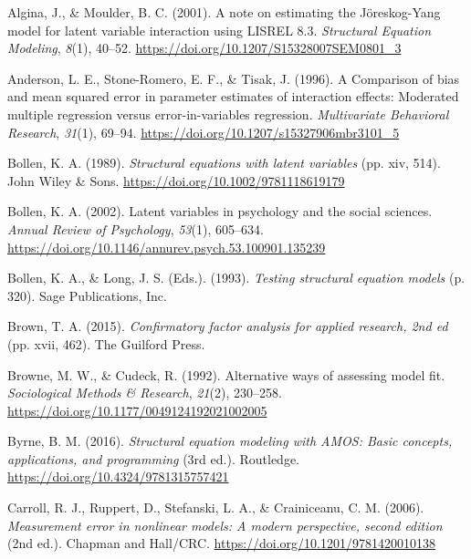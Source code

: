 \documentclass[
  man]{apa6}
\newlength{\cslhangindent}
\newenvironment{CSLReferences}[2] %
 {\begin{list}{}{%
  \setlength{\itemindent}{0pt}
  \setlength{\leftmargin}{0pt}
  \setlength{\parsep}{0pt}
  \ifodd #1
   \setlength{\leftmargin}{\cslhangindent}
   \setlength{\itemindent}{-1\cslhangindent}
  \fi
  \setlength{\itemsep}{#2\baselineskip}}}
 {\end{list}}
\begin{document}
\label{refs}
\begin{CSLReferences}{1}{0}
Algina, J., \& Moulder, B. C. (2001). A note on estimating the {J{ö}reskog-Yang} model for latent variable interaction using {LISREL} 8.3. \emph{Structural Equation Modeling}, \emph{8}(1), 40--52. \url{https://doi.org/10.1207/S15328007SEM0801_3}

Anderson, L. E., Stone-Romero, E. F., \& Tisak, J. (1996). A {Comparison} of bias and mean squared error in parameter estimates of interaction effects: {Moderated} multiple regression versus error-in-variables regression. \emph{Multivariate Behavioral Research}, \emph{31}(1), 69--94. \url{https://doi.org/10.1207/s15327906mbr3101_5}

Bollen, K. A. (1989). \emph{Structural equations with latent variables} (pp. xiv, 514). John Wiley \& Sons. \url{https://doi.org/10.1002/9781118619179}

Bollen, K. A. (2002). Latent variables in psychology and the social sciences. \emph{Annual Review of Psychology}, \emph{53}(1), 605--634. \url{https://doi.org/10.1146/annurev.psych.53.100901.135239}

Bollen, K. A., \& Long, J. S. (Eds.). (1993). \emph{Testing structural equation models} (p. 320). Sage Publications, Inc.

Brown, T. A. (2015). \emph{Confirmatory factor analysis for applied research, 2nd ed} (pp. xvii, 462). The Guilford Press.

Browne, M. W., \& Cudeck, R. (1992). Alternative ways of assessing model fit. \emph{Sociological Methods \& Research}, \emph{21}(2), 230--258. \url{https://doi.org/10.1177/0049124192021002005}

Byrne, B. M. (2016). \emph{Structural equation modeling with {AMOS}: {Basic} concepts, applications, and programming} (3rd ed.). Routledge. \url{https://doi.org/10.4324/9781315757421}

Carroll, R. J., Ruppert, D., Stefanski, L. A., \& Crainiceanu, C. M. (2006). \emph{Measurement error in nonlinear models: {A} modern perspective, second edition} (2nd ed.). {Chapman and Hall/CRC}. \url{https://doi.org/10.1201/9781420010138}


\end{CSLReferences}
\end{document}
